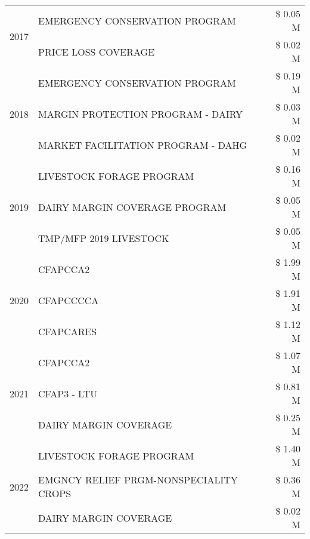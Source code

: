 \begin{tabular}{llr}
\cline{1-3}
\multirow[t]{2}{*}{2017} & EMERGENCY CONSERVATION PROGRAM & \$ 0.05 M \\
 & PRICE LOSS COVERAGE & \$ 0.02 M \\
\cline{1-3}
\multirow[t]{3}{*}{2018} & EMERGENCY CONSERVATION PROGRAM & \$ 0.19 M \\
 & MARGIN PROTECTION PROGRAM - DAIRY & \$ 0.03 M \\
 & MARKET FACILITATION PROGRAM - DAHG & \$ 0.02 M \\
\cline{1-3}
\multirow[t]{3}{*}{2019} & LIVESTOCK FORAGE PROGRAM & \$ 0.16 M \\
 & DAIRY MARGIN COVERAGE PROGRAM & \$ 0.05 M \\
 & TMP/MFP 2019 LIVESTOCK & \$ 0.05 M \\
\cline{1-3}
\multirow[t]{3}{*}{2020} & CFAPCCA2 & \$ 1.99 M \\
 & CFAPCCCCA & \$ 1.91 M \\
 & CFAPCARES & \$ 1.12 M \\
\cline{1-3}
\multirow[t]{3}{*}{2021} & CFAPCCA2 & \$ 1.07 M \\
 & CFAP3 - LTU & \$ 0.81 M \\
 & DAIRY MARGIN COVERAGE & \$ 0.25 M \\
\cline{1-3}
\multirow[t]{3}{*}{2022} & LIVESTOCK FORAGE PROGRAM & \$ 1.40 M \\
 & EMGNCY RELIEF PRGM-NONSPECIALITY CROPS & \$ 0.36 M \\
 & DAIRY MARGIN COVERAGE & \$ 0.02 M \\
\cline{1-3}
\bottomrule
\end{tabular}
